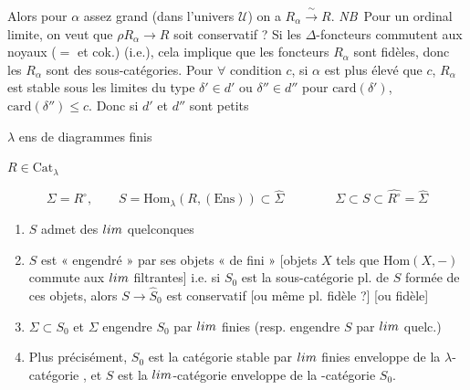 \documentclass[11pt,a4paper]{article}
\begin{document}
Alors pour $\alpha$ assez grand (dans l'univers $\mathcal{U}$) on a
$R_{\alpha} \xrightarrow{\ \sim\ } R$. \emph{NB}\ Pour un ordinal
limite, on veut que $\rho R_{\alpha} \to R$ soit conservatif ? Si les
$\Delta$-foncteurs \struck{\ill{}} commutent aux noyaux ($=$
 et cok.)  (i.e.), cela
implique que les foncteurs $R_{\alpha}$ sont  fidèles,
donc les $R_{\alpha}$ sont des sous-catégories. Pour $\forall$ condition
$c$, si $\alpha$ est plus élevé que $c$, $R_{\alpha}$ est stable sous les
limites du type $\delta' \in d'$ ou $\delta'' \in d''$ pour
$\mathrm{card}(\delta')$, $\mathrm{card}(\delta'') \leqslant c$. Donc si
$d'$ et $d''$ sont petits

$\lambda$ ens de diagrammes finis

$R \in \mathrm{Cat}_{\lambda}$ \struck{\ill{}}

\[
  \Sigma = R^{\circ}, \qquad S = \mathrm{Hom}_{\lambda}(R, (\mathrm{Ens}))
  \subset \hat{\Sigma} \qquad\qquad
  \Sigma \subset S \subset \widehat{R^{\circ}} = \hat{\Sigma}
\]

\begin{enumerate}
  \item[a)] $S$ admet des $\varinjlim$ quelconques
  \item[b)] $S$ est « engendré » par ses objets « de 
     fini » [objets
    $X$ tels que $\mathrm{Hom}(X, -)$ commute aux $\varinjlim$ filtrantes]
    i.e. si $S_{0}$ est la sous-catégorie pl. de $S$ formée de ces
    objets, alors $S \to \hat{S}_{0}$  est
    conservatif [ou même pl. fidèle ?] [ou fidèle]
  \item[c)] $\Sigma \subset S_{0}$ et $\Sigma$ engendre $S_{0}$ par
    $\varinjlim$ finies (resp. engendre $S$ par $\varinjlim$ quelc.)
  \item[d)] Plus précisément, $S_{0}$ est la catégorie stable par
    $\varinjlim$ finies enveloppe de la $\lambda$-catégorie
    \struck{$\Sigma$}, et $S$ est la $\varinjlim$-catégorie enveloppe de
    la -catégorie $S_{0}$.
\end{enumerate}
\end{document}
